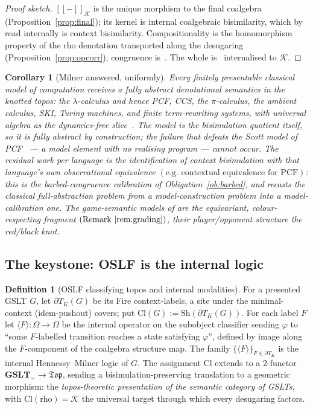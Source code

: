 \documentclass[11pt]{article}
\newcommand{\sem}[1]{[\![#1]\!]}
\newcommand{\dT}{\partial T}
\newcommand{\Top}{\mathfrak{Top}}
\newcommand{\GSLTsem}{\mathbf{GSLT}_{\!\sim}}
\newcommand{\Cl}{\mathrm{Cl}}
\newcommand{\Sh}{\mathrm{Sh}}
\newcommand{\Ks}{\mathcal{K}}
\newcommand{\Av}{\Omega}
\theoremstyle{plain}
\newtheorem{corollary}[theorem]{Corollary}
\theoremstyle{definition}
\newtheorem{definition}[theorem]{Definition}
\theoremstyle{remark}
\begin{document}
\begin{proof}[Proof sketch]
$\sem{-}_{\Ks}$ is the unique morphism to the final coalgebra (Proposition~\ref{prop:final}); its
kernel is internal coalgebraic bisimilarity, which by~\cite[Lem.~16]{knotrho} read internally is
context bisimilarity. Compositionality is the homomorphism property of the rho denotation
\cite[Thm.~15]{knotrho} transported along the desugaring (Proposition~\ref{prop:opcorr}); congruence
is~\cite[Prop.~4]{knotrho}. The whole is~\cite[Thm.~18]{knotrho} internalised to $\Ks$.
\end{proof}

\begin{corollary}[Milner answered, uniformly]\label{cor:milner}
Every finitely presentable classical model of computation receives a fully abstract denotational
semantics in the knotted topos: the $\lambda$-calculus and hence PCF, CCS, the $\pi$-calculus, the
ambient calculus, SKI, Turing machines, and finite term-rewriting systems, with universal algebra as
the dynamics-free slice~\cite{gsltnotes}. The model is the bisimulation quotient itself, so it is fully
abstract by construction; the failure that defeats the Scott model of PCF~\cite{milnerfa,plotkinlcf}
--- a model element with no realising program --- cannot occur. The residual work per language is the
identification of context bisimulation with that language's own observational equivalence
$(\text{e.g.\ contextual equivalence for PCF})$: this is the barbed-congruence calibration of
Obligation~\ref{ob:barbed}, and recasts the classical full-abstraction problem from a
model-\emph{construction} problem into a model-\emph{calibration} one. The game-semantic models of
\cite{ajm,ho} are the equivariant, colour-respecting fragment $(\text{Remark~\ref{rem:grading}})$,
their player/opponent structure the red/black knot.
\end{corollary}

\subsection{The keystone: OSLF is the internal logic}\label{sec:logic}

\begin{definition}[OSLF classifying topos and internal modalities]\label{def:cl}
For a presented GSLT $G$, let $\dT_K(G)$ be its Fire context-labels, a site under the minimal-context
(idem-pushout) covers; put $\Cl(G):=\Sh(\dT_K(G))$. For each label $F$ let
$\langle F\rangle\colon\Av\to\Av$ be the internal operator on the subobject classifier sending
$\varphi$ to ``some $F$-labelled transition reaches a state satisfying $\varphi$'', defined by image
along the $F$-component of the coalgebra structure map. The family $\{\langle F\rangle\}_{F\in\dT_K}$
is the internal Hennessy--Milner logic of $G$. The assignment $\Cl$ extends to a $2$-functor
$\GSLTsem\to\Top$, sending a bisimulation-preserving translation to a geometric morphism: the
\emph{topos-theoretic presentation of the semantic category of GSLTs}, with $\Cl(\text{rho})=\Ks$ the
universal target through which every desugaring factors.
\end{definition}
\end{document}
